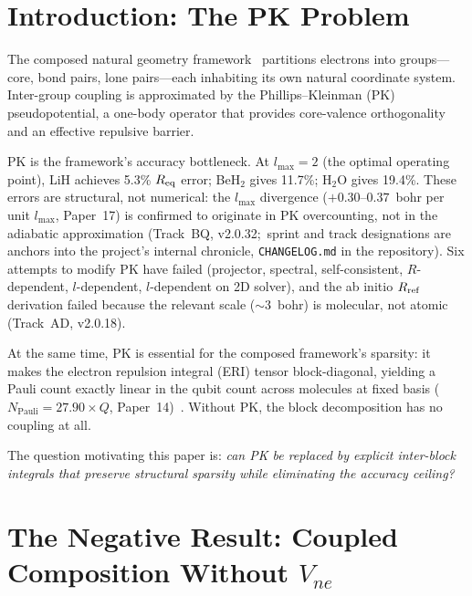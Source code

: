 \documentclass[aps,pra,twocolumn,superscriptaddress,longbibliography]{revtex4-2}
\begin{document}
\maketitle

\section{Introduction: The PK Problem}
\label{sec:intro}

The composed natural geometry framework~\cite{loutey_paper17}
partitions electrons into groups---core, bond pairs, lone pairs---each
inhabiting its own natural coordinate system.  Inter-group coupling is
approximated by the Phillips--Kleinman (PK) pseudopotential, a
one-body operator that provides core-valence orthogonality and an
effective repulsive barrier.

PK is the framework's accuracy bottleneck.  At $l_{\max} = 2$ (the
optimal operating point), LiH achieves 5.3\% $R_{\rm eq}$ error;
BeH$_2$ gives 11.7\%; H$_2$O gives 19.4\%.  These errors are
structural, not numerical: the $l_{\max}$ divergence
($+0.30$--$0.37$~bohr per unit $l_{\max}$, Paper~17) is confirmed to
originate in PK overcounting, not in the adiabatic approximation
(Track~BQ, v2.0.32;\ sprint and track designations are anchors into the project's internal chronicle, \texttt{CHANGELOG.md} in the repository).  Six attempts to modify PK have failed
(projector, spectral, self-consistent, $R$-dependent, $l$-dependent,
$l$-dependent on 2D solver), and the ab initio $R_{\rm ref}$
derivation failed because the relevant scale (${\sim}3$~bohr) is
molecular, not atomic (Track~AD, v2.0.18).

At the same time, PK is essential for the composed framework's
sparsity: it makes the electron repulsion integral (ERI) tensor
block-diagonal, yielding a Pauli count exactly linear in the qubit
count across molecules at fixed basis
($N_{\mathrm{Pauli}} = 27.90 \times Q$,
Paper~14)~\cite{loutey_paper14}.  Without PK, the block
decomposition has no coupling at all.

The question motivating this paper is: \emph{can PK be replaced by
explicit inter-block integrals that preserve structural sparsity while
eliminating the accuracy ceiling?}


\section{The Negative Result: Coupled Composition Without $V_{ne}$}
\label{sec:negative}
\end{document}
